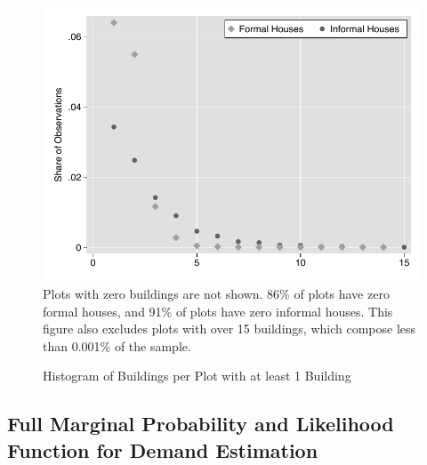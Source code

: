 \documentclass[12pt]{article}
\begin{document}
\begin{figure}[!htb]
      {  \centering
   \caption[ Histogram of Buildings per Plot with at least 1 Building ]
    {\small Histogram of Buildings per Plot with at least 1 Building }\label{figure:buildhist} 
\includegraphics[width=\textwidth,trim={0.3cm .3cm 0.1cm 0cm}, clip=true]{figures/building_hist.pdf}
Plots with zero buildings are not shown.  86\% of plots have zero formal houses, and 91\% of plots have zero informal houses.
This figure also excludes plots with over 15 buildings, which compose less than 0.001\% of the sample.
}
\end{figure}

\subsection{Full Marginal Probability and Likelihood Function for Demand Estimation}\label{appendix:likelihood}
\end{document}
